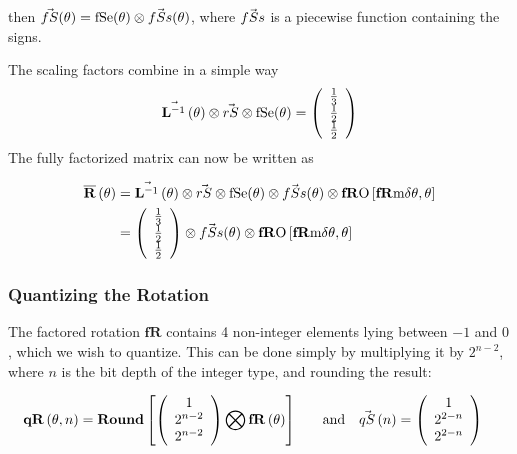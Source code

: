 then $\fS (\theta) = \fSe (\theta) \otimes \fSs(\theta)$, where $\fSs$ is a piecewise function containing the signs. 

The scaling factors combine in a simple way
\begin{equation}
\nS[\theta] \otimes \rS \otimes \fSe (\theta)   = 
\left(
\begin{array}{c}
 \frac{1}{3}  \\
 \frac{1}{2}\\
 \frac{1}{2} \\
\end{array}
\right)
\end{equation}
The fully factorized matrix can now be written as

\begin{align*}
\nR[\theta] & = \nS[\theta] \otimes \rS \otimes \fSe (\theta) \otimes \fSs(\theta) \otimes\fRO \left[  \fRm{ \thetaA }, \theta \right] \\
& = \left(
\begin{array}{c}
 \frac{1}{3}  \\
 \frac{1}{2}\\
 \frac{1}{2} \\
\end{array}
\right) \otimes \fSs(\theta) \otimes\fRO \left[  \fRm{\thetaA}, \theta \right] \\
\end{align*}

\subsubsection{Quantizing the Rotation}

The factored rotation $\mathbf{fR}$ contains 4 non-integer elements lying between $-1$ and $0$, which we wish to quantize. This can be done simply by multiplying it by $2^{n - 2}$, where $n$ is the bit depth of the integer type, and rounding the result: 

\begin{align}\label{eq:quantizedMatrixDef}
 \qR[\theta, n] &=
\textbf{Round}\left[
\left(
\begin{array}{c}
 1  \\
 2^{n - 2} \\
 2^{n - 2}  \\
\end{array}
\right)
\bigotimes
\fR[\theta] \right] 
\quad &\text{and} \quad 
\qS[n] &= \left(
\begin{array}{c}
 1  \\
 2^{2-n } \\
 2^{2-n }  \\
\end{array}
\right) 
\end{align}



